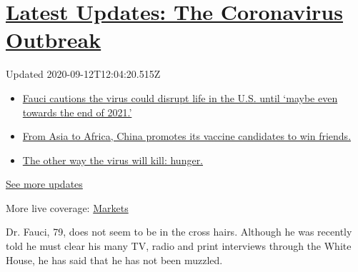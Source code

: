 \hypertarget{latest-updates-the-coronavirus-outbreak}{%
\section{\texorpdfstring{\href{https://www.nytimes3xbfgragh.onion/2020/09/11/world/covid-19-coronavirus.html?action=click\&pgtype=Article\&state=default\&region=MAIN_CONTENT_1\&context=storylines_live_updates}{Latest
Updates: The Coronavirus
Outbreak}}{Latest Updates: The Coronavirus Outbreak}}\label{latest-updates-the-coronavirus-outbreak}}

Updated 2020-09-12T12:04:20.515Z

\begin{itemize}
\tightlist
\item
  \href{https://www.nytimes3xbfgragh.onion/2020/09/11/world/covid-19-coronavirus.html?action=click\&pgtype=Article\&state=default\&region=MAIN_CONTENT_1\&context=storylines_live_updates\#link-dfb8a16}{Fauci
  cautions the virus could disrupt life in the U.S. until `maybe even
  towards the end of 2021.'}
\item
  \href{https://www.nytimes3xbfgragh.onion/2020/09/11/world/covid-19-coronavirus.html?action=click\&pgtype=Article\&state=default\&region=MAIN_CONTENT_1\&context=storylines_live_updates\#link-7104d154}{From
  Asia to Africa, China promotes its vaccine candidates to win friends.}
\item
  \href{https://www.nytimes3xbfgragh.onion/2020/09/11/world/covid-19-coronavirus.html?action=click\&pgtype=Article\&state=default\&region=MAIN_CONTENT_1\&context=storylines_live_updates\#link-393ad215}{The
  other way the virus will kill: hunger.}
\end{itemize}

\href{https://www.nytimes3xbfgragh.onion/2020/09/11/world/covid-19-coronavirus.html?action=click\&pgtype=Article\&state=default\&region=MAIN_CONTENT_1\&context=storylines_live_updates}{See
more updates}

More live coverage:
\href{https://www.nytimes3xbfgragh.onion/live/2020/09/11/business/stock-market-today-coronavirus?action=click\&pgtype=Article\&state=default\&region=MAIN_CONTENT_1\&context=storylines_live_updates}{Markets}

Dr. Fauci, 79, does not seem to be in the cross hairs. Although he was
recently told he must clear his many TV, radio and print interviews
through the White House, he has said that he has not been muzzled.


